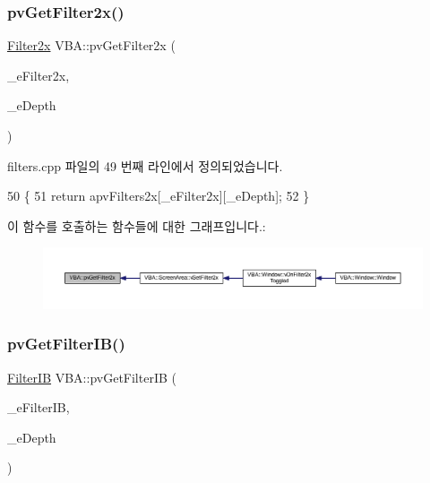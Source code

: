 \subsubsection{\texorpdfstring{pv\+Get\+Filter2x()}{pvGetFilter2x()}}
{\footnotesize\ttfamily \mbox{\hyperlink{class_v_b_a_accd36b6c101a516c50cf8288976739c4}{Filter2x}} V\+B\+A\+::pv\+Get\+Filter2x (\begin{DoxyParamCaption}\item[{\mbox{\hyperlink{class_v_b_a_a1683020d7324daf3bda627d0d3658e3e}{E\+Filter2x}}}]{\+\_\+e\+Filter2x,  }\item[{\mbox{\hyperlink{class_v_b_a_a6ec41ea038b4ea42eb8d9ea59d3eb4c5}{E\+Filter\+Depth}}}]{\+\_\+e\+Depth }\end{DoxyParamCaption})}



filters.\+cpp 파일의 49 번째 라인에서 정의되었습니다.


\begin{DoxyCode}
50 \{
51   \textcolor{keywordflow}{return} apvFilters2x[\_eFilter2x][\_eDepth];
52 \}
\end{DoxyCode}
이 함수를 호출하는 함수들에 대한 그래프입니다.\+:
\nopagebreak
\begin{figure}[H]
\begin{center}
\leavevmode
\includegraphics[width=350pt]{namespace_v_b_a_a2a6c0188179e4ee017369e21d8e6f268_icgraph}
\end{center}
\end{figure}
\mbox{\label{namespace_v_b_a_ad5980a2981a7b766dce52ebc49a987bb}} 
\subsubsection{\texorpdfstring{pv\+Get\+Filter\+I\+B()}{pvGetFilterIB()}}
{\footnotesize\ttfamily \mbox{\hyperlink{class_v_b_a_a3269ee707f37ad255f2b7b0f20921158}{Filter\+IB}} V\+B\+A\+::pv\+Get\+Filter\+IB (\begin{DoxyParamCaption}\item[{\mbox{\hyperlink{class_v_b_a_a304ffeb9f4a8b26e7fa4e2eb620d780f}{E\+Filter\+IB}}}]{\+\_\+e\+Filter\+IB,  }\item[{\mbox{\hyperlink{class_v_b_a_a6ec41ea038b4ea42eb8d9ea59d3eb4c5}{E\+Filter\+Depth}}}]{\+\_\+e\+Depth }\end{DoxyParamCaption})}



